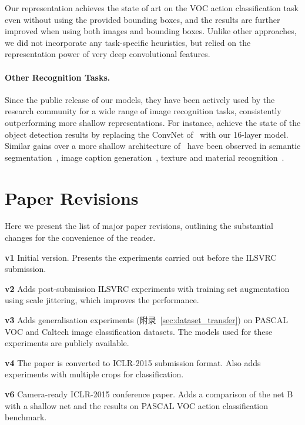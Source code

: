 \documentclass{article} %
\newcommand{\apref}[1]{附录~\ref{#1}}
\begin{document}
Our representation achieves the state of art on the VOC action classification task even without using the provided bounding boxes, and the results are further improved when using both images and bounding boxes.
Unlike other approaches, we did not incorporate any task-specific heuristics, but relied on the representation power of very deep convolutional features.

\paragraph{Other Recognition Tasks.}
Since the public release of our models, they have been actively used by the research community for a wide range of image recognition tasks, consistently outperforming more shallow representations. For instance, \citet{Girshick14a} achieve the state of the object detection results by replacing the ConvNet of~\citet{Krizhevsky12} with our 16-layer model. Similar gains over a more shallow architecture of~\citet{Krizhevsky12} have been observed in semantic segmentation~\citep{Long14}, image caption generation~\citep{Kiros14,Karpathy14a}, texture and material recognition~\citep{Cimpoi14a,Bell14}.



\section{Paper Revisions}
\label{sec:revisions}
Here we present the list of major paper revisions, outlining the substantial changes for the convenience of the reader.

\textbf{v1} Initial version. Presents the experiments carried out before the ILSVRC submission.

\textbf{v2} Adds post-submission ILSVRC experiments with training set augmentation using scale jittering, which improves the performance.

\textbf{v3} Adds generalisation experiments (\apref{sec:dataset_transfer}) on PASCAL VOC and Caltech image classification datasets. The models used for these experiments are publicly available.

\textbf{v4} The paper is converted to ICLR-2015 submission format. Also adds experiments with multiple crops for classification.

\textbf{v6} Camera-ready ICLR-2015 conference paper. Adds a comparison of the net B with a shallow net and the results on PASCAL VOC action classification benchmark.
\end{document}
